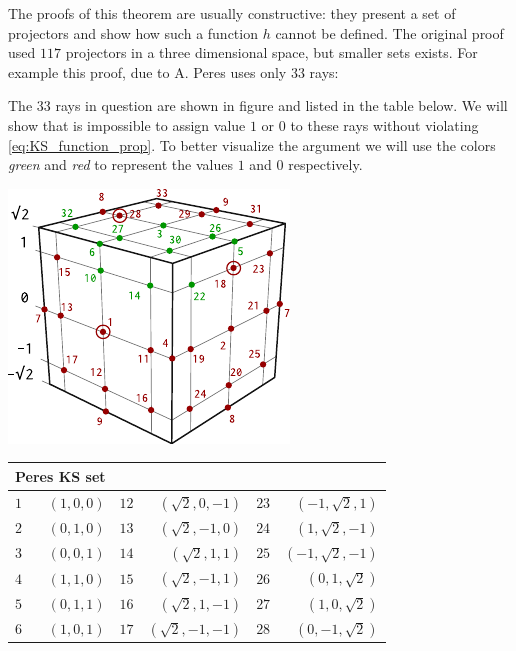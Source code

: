 \documentclass[a4paper]{article}
\theoremstyle{definition}
\let\oldproof\proof
\let\oldendproof\endproof
\renewenvironment{proof}
    {
        \begin{framed} 
        \oldproof
    }
    {
        \oldendproof 
        \end{framed}
    }
\begin{document}
The proofs of this theorem are usually constructive: they present a set of
projectors and show how such a function $h$ cannot be defined.
The original proof used $117$ projectors in a three dimensional space, but
smaller sets exists.
For example this proof, due to A. Peres uses only 33 rays:
\begin{proof}
    The 33 rays in question are shown in figure and listed in the table below.
    We will show that is impossible to assign value $1$ or $0$ to these rays
    without violating \eqref{eq:KS_function_prop}.
    To better visualize the argument we will use the colors \emph{green} and
    \emph{red} to represent the values $1$ and $0$ respectively.

    \begin{center}
        \includegraphics[scale=1.5]{KS33cube.pdf} \\
    \end{center}
    \begin{center}
    \begin{tabular}{lrlrlr}
        \multicolumn{2}{l}{Peres KS set} \\
        \toprule
        $1$ & $(1, 0, 0)$ & $12$ & $(\sqrt{2}, 0, -1)$ & $23$ & $(-1, \sqrt{2}, 1)$ \\ 
        $2$ & $(0, 1, 0)$ & $13$ & $(\sqrt{2}, -1, 0)$  & $24$ & $(1, \sqrt{2}, -1)$ \\
        $3$ & $(0, 0, 1)$ & $14$ & $(\sqrt{2}, 1, 1)$  & $25$ & $(-1, \sqrt{2}, -1)$ \\
        $4$ & $(1, 1, 0)$ & $15$ & $(\sqrt{2}, -1, 1)$  & $26$ & $(0, 1,\sqrt{2})$ \\
        $5$ & $(0, 1, 1)$ & $16$ & $(\sqrt{2}, 1, -1)$  & $27$ & $(1, 0, \sqrt{2})$ \\
        $6$ & $(1, 0, 1)$ & $17$ & $(\sqrt{2}, -1, -1)$  & $28$ & $(0, -1,\sqrt{2})$ \\

\end{tabular}
\end{center}
\end{proof}
\end{document}
